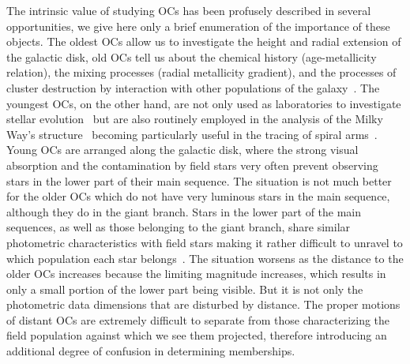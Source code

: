 \documentclass[draft]{aa}
\begin{document}
 The intrinsic value of studying OCs has been profusely described in several
 opportunities, we  give here only a brief enumeration of the importance
 of these objects. The oldest OCs
 allow us to investigate the height and radial extension of the galactic disk,
 old OCs tell us about the chemical history (age-metallicity relation), the
 mixing processes (radial metallicity gradient), and the processes of cluster
 destruction by interaction with other populations of the
 galaxy~\citep{Friel1995,Tosi_2004,Lamers_2005}.
 The youngest OCs, on the other hand, are not only used as laboratories to
 investigate stellar evolution~\citep[they allow studying in detail the boundary
 conditions necessary to create new generations of stars, ][]{Lada2003} but are
 also routinely employed in the analysis of the Milky Way's
 structure~\citep{Loktin_1992,Moitinho_2006,Vazquez2008,Moitinho_2010}
 becoming particularly useful in the tracing of spiral
 arms~\citep{carraro_2013,Molina_2018}.
 Young OCs are arranged along the galactic disk, where the strong visual
 absorption and the contamination by field stars very often prevent observing
 stars in the lower part of their main sequence.
 The situation is not much better for the older OCs which do not
 have very luminous stars in the main sequence, although they do in the giant
 branch. Stars in the lower part of the main sequences, as well as those
 belonging to the giant branch, share similar photometric characteristics with
 field stars making it rather difficult to unravel to which population each star
 belongs~\citep{Hayes_2015}.
 The situation worsens as the distance to the older OCs increases because the
 limiting magnitude increases, which results in only a small portion of
 the lower part being visible. But it is not only the photometric
 data dimensions that are disturbed by distance. The proper
 motions of distant OCs are
 extremely difficult to separate from those characterizing the field
 population against which we see them projected, therefore introducing an
 additional degree of confusion in determining memberships.
\end{document}
